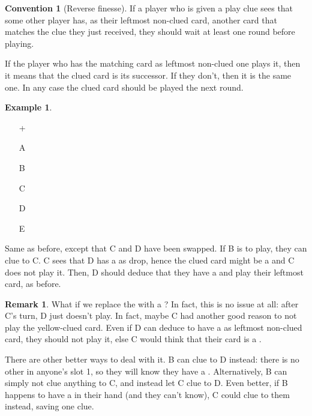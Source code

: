 \documentclass[a4paper]{article}
\theoremstyle{plain}
\theoremstyle{definition}
\newtheorem{remark}[theorem]{Remark}
\newtheorem{example}[theorem]{Example}
\newtheorem{convention}[theorem]{Convention}
\begin{document}
\begin{convention}[Reverse finesse]
	If a player who is given a play clue sees that some other player has, as their leftmost non-clued card, another card that matches the clue they just received, they should wait at least one round before playing.
\end{convention}

If the player who has the matching card as leftmost non-clued one plays it, then it means that the clued card is its successor. If they don't, then it is the same one. In any case the clued card should be played the next round.

\begin{example} \hfill \\
	\begin{minipage}{0.45\textwidth}
		\begin{itemize}
			\item[\Large +]      
			\item[\Large A]    
			\item[\Large B]    
			\item[\Large C]    
			\item[\Large D]    
			\item[\Large E]    
		\end{itemize}
	\end{minipage}%
	\begin{minipage}{0.55\textwidth}
		Same as before, except that C and D have been swapped. If B is to play, they can clue  to C. C sees that D has a  as drop, hence the clued card might be a  and C does not play it. Then, D should deduce that they have a  and play their leftmost card, as before.
	\end{minipage}
\end{example} \vspace{0.15 cm}

\begin{remark}
	What if we replace the  with a ? In fact, this is no issue at all: after C's turn, D just doesn't play. In fact, maybe C had another good reason to not play the yellow-clued card. Even if D can deduce to have a  as leftmost non-clued card, they should not play it, else C would think that their card is a .
	
	There are other better ways to deal with it. B can clue  to D instead: there is no other  in anyone's slot 1, so they will know they have a . Alternatively, B can simply not clue anything to C, and instead let C clue  to D. Even better, if B happens to have a  in their hand (and they can't know), C could clue  to them instead, saving one clue.
\end{remark}
\end{document}
